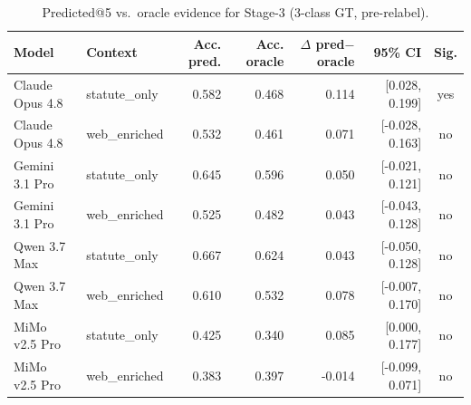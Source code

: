 \begin{table}[htbp]
  \centering
  \caption{Predicted@5 vs.\ oracle evidence for Stage-3 (3-class GT, pre-relabel).}
  \label{tab:fulfillment-retrieval}
  \begin{tabular}{llrrrrc}
    \toprule
    Model & Context & Acc. pred. & Acc. oracle & $\Delta$ pred$-$oracle & 95\% CI & Sig. \\
    \midrule
    Claude Opus 4.8 & statute\_only & 0.582 & 0.468 & 0.114 & [0.028, 0.199] & yes \\
    Claude Opus 4.8 & web\_enriched & 0.532 & 0.461 & 0.071 & [-0.028, 0.163] & no \\
    Gemini 3.1 Pro & statute\_only & 0.645 & 0.596 & 0.050 & [-0.021, 0.121] & no \\
    Gemini 3.1 Pro & web\_enriched & 0.525 & 0.482 & 0.043 & [-0.043, 0.128] & no \\
    Qwen 3.7 Max & statute\_only & 0.667 & 0.624 & 0.043 & [-0.050, 0.128] & no \\
    Qwen 3.7 Max & web\_enriched & 0.610 & 0.532 & 0.078 & [-0.007, 0.170] & no \\
    MiMo v2.5 Pro & statute\_only & 0.425 & 0.340 & 0.085 & [0.000, 0.177] & no \\
    MiMo v2.5 Pro & web\_enriched & 0.383 & 0.397 & -0.014 & [-0.099, 0.071] & no \\
    \bottomrule
  \end{tabular}
\end{table}

